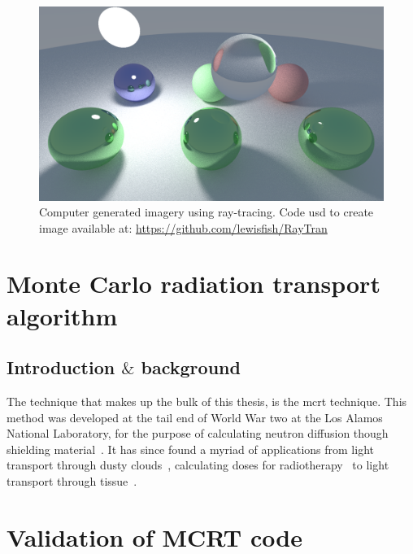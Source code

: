 \begin{figure}
\centering
\includegraphics[width=\columnwidth]{./MCRT/images/ray-tracing.png}
\caption{Computer generated imagery using ray-tracing. Code usd to create image available at: \url{https://github.com/lewisfish/RayTran}}
\label{fig:ray-trace}
\end{figure}

\section{Monte Carlo radiation transport algorithm}

\subsection{Introduction $\&$ background}
The technique that makes up the bulk of this thesis, is the \gls{mcrt} technique. This method was developed at the tail end of World War two at the Los Alamos National Laboratory, for the purpose of calculating neutron diffusion though shielding material~\cite{montybeg1,eckhardt1987stan,anderson1986metropolis,ulam1947statistical}. It has since found a myriad of applications from light transport through dusty clouds~\cite{wood1999model}, calculating doses for radiotherapy~\cite{rogers1995beam} to light transport through tissue~\cite{1stmonty}.

\section{Validation of MCRT code}
